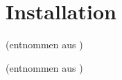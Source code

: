 \chapter{Installation}


(entnommen aus \cite[S. 5, f.]{projss15})


(entnommen aus \cite[S. 4]{projss15})
